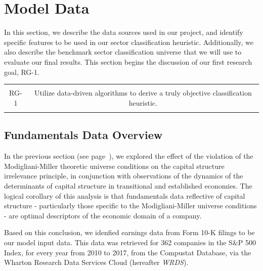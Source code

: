 \documentclass[../main.tex]{subfiles}
\begin{document}
\chapter{Model Data} \label{model_data}

In this section, we describe the data sources used in our project, and identify specific features to be used in our sector classification heuristic. Additionally, we also describe the benchmark sector classification universe that we will use to evaluate our final results. This section begins the discussion of our first research goal, RG-1.
  
 \begin{table}[h!]
    \centering
    \begin{tabular}{| c | c |}
        \hline
        &  \\
        RG-1 & Utilize data-driven algorithms to derive a truly objective classification heuristic. \\
        & \\
        \hline
    \end{tabular}
\end{table}

\section{Fundamentals Data Overview}

In the previous section (see page~\pageref{literature_review:economic_sectors_fundamentals}), we explored the effect of the violation of the Modigliani-Miller theoretic universe conditions on the capital structure irrelevance principle, in conjunction with observations of the dynamics of the determinants of capital structure in transitional and established economies. The logical corollary of this analysis is that fundamentals data reflective of capital structure - particularly those specific to the Modigliani-Miller universe conditions - are optimal descriptors of the economic domain of a company.

Based on this conclusion, we idenfied earnings data from Form 10-K filings to be our model input data. This data was retrieved for 362 companies in the S\&P 500 Index, for every year from 2010 to 2017, from the Compustat Database, via the Wharton Research Data Services Cloud (hereafter \textit{WRDS}).
\end{document}
